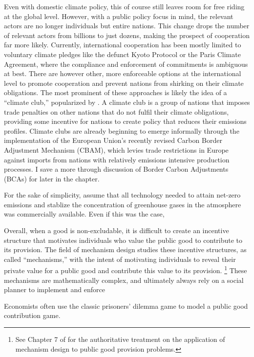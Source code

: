 Even with domestic climate policy, this of course still leaves room for free riding at the global level. However, with a public policy focus in mind, the relevant actors are no longer individuals but entire nations. This change drops the number of relevant actors from billions to just dozens, making the prospect of cooperation far more likely. Currently, international cooperation has been mostly limited to voluntary climate pledges like the defunct Kyoto Protocol or the Paris Climate Agreement, where the compliance and enforcement of commitments is ambiguous at best. There are however other, more enforceable options at the international level to promote cooperation and prevent nations from shirking on their climate obligations. The most prominent of these approaches is likely the idea of a ``climate club,'' popularized by \cite{nordhaus2015climate}. A climate club is a group of nations that imposes trade penalties on other nations that do not fulfil their climate obligations, providing some incentive for nations to create policy that reduces their emissions profiles. Climate clubs are already beginning to emerge informally through the implementation of the European Union's recently revised Carbon Border Adjustment Mechanism (CBAM), which levies trade restrictions in Europe against imports from nations with relatively emissions intensive production processes. I save a more through discussion of Border Carbon Adjustments (BCAs) for later in the chapter. 


For the sake of simplicity, assume that all technology needed to attain net-zero emissions and stablize the concentration of greenhouse gases in the atmosphere was commercially available. Even if this was the case, 



Overall, when a good is non-excludable, it is difficult to create an incentive structure that motivates individuals who value the public good to contribute to its provision. The field of mechanism design studies these incentive structures, as called ``mechanisms,''  with the intent of motivating individuals to reveal their private value for a public good and contribute this value to its provision. \footnote{See Chapter 7 of \cite{fudenberg1991game} for the authoritative treatment on the application of mechanism design to public good provision problems.} These mechanisms are mathematically complex, and ultimately always rely on a social planner to implement and enforce


Economists often use the classic prisoners' dilemma game to model a public good contribution game. 

